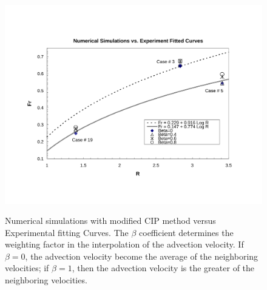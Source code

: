 \begin{figure}[H]
\hspace{0.0in}
\includegraphics[width=5.5in]{../figures/Fr-R/Fr_R_060425.pdf}
\label{fig:GravityCurrents-Fr-R}
\caption{Numerical simulations with modified CIP method versus Experimental fitting Curves. The $\beta$ coefficient determines the weighting factor in the interpolation of the advection velocity. If $\beta = 0$, the advection velocity become the average of the neighboring velocities; if $\beta = 1$, then the advection velocity is the greater of the neighboring velocities.}
\end{figure}

\cp



















